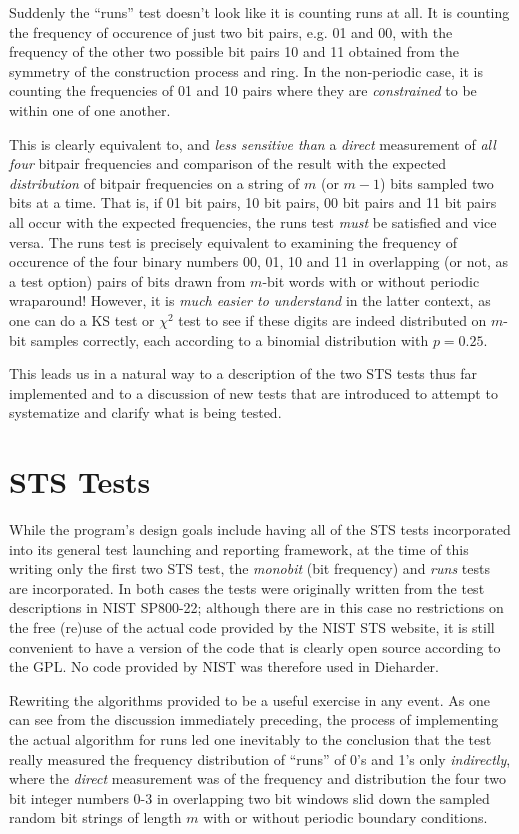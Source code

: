 \documentclass{book}
\begin{document}
Suddenly the ``runs'' test doesn't look like it is counting runs at all.
It is counting the frequency of occurence of just two bit pairs, e.g. 01
and 00, with the frequency of the other two possible bit pairs 10 and 11
obtained from the symmetry of the construction process and ring.  In the
non-periodic case, it is counting the frequencies of 01 and 10 pairs
where they are {\em constrained} to be within one of one another.

This is clearly equivalent to, and {\em less sensitive than} a {\em
direct} measurement of {\em all four} bitpair frequencies and comparison
of the result with the expected {\em distribution} of bitpair
frequencies on a string of $m$ (or $m-1$) bits sampled two bits at a
time.  That is, if 01 bit pairs, 10 bit pairs, 00 bit pairs and 11 bit
pairs all occur with the expected frequencies, the runs test {\em must}
be satisfied and vice versa.  The runs test is precisely equivalent to
examining the frequency of occurence of the four binary numbers 00, 01,
10 and 11 in overlapping (or not, as a test option) pairs of bits drawn
from $m$-bit words with or without periodic wraparound!  However, it is
{\em much easier to understand} in the latter context, as one can do a
KS test or $\chi^2$ test to see if these digits are indeed distributed
on $m$-bit samples correctly, each according to a binomial distribution
with $p = 0.25$.

This leads us in a natural way to a description of the two STS tests
thus far implemented and to a discussion of new tests that are
introduced to attempt to systematize and clarify what is being tested.

\section{STS Tests}

While the program's design goals include having all of the STS tests
incorporated into its general test launching and reporting framework, at
the time of this writing only the first two STS test, the {\em monobit}
(bit frequency) and {\em runs} tests are incorporated.  In both cases
the tests were originally written from the test descriptions in NIST
SP800-22; although there are in this case no restrictions on the free
(re)use of the actual code provided by the NIST STS website, it is still
convenient to have a version of the code that is clearly open source
according to the GPL.  No code provided by NIST was therefore used in
Dieharder.

Rewriting the algorithms provided to be a useful exercise in any event.
As one can see from the discussion immediately preceding, the process of
implementing the actual algorithm for runs led one inevitably to the
conclusion that the test really measured the frequency distribution of
``runs'' of 0's and 1's only {\em indirectly}, where the {\em direct}
measurement was of the frequency and distribution the four two bit
integer numbers 0-3 in overlapping two bit windows slid down the sampled
random bit strings of length $m$ with or without periodic boundary
conditions.
\end{document}
